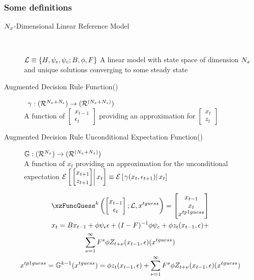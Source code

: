 \documentclass[tikz]{beamer}
\begin{document}
\begin{frame}
  \frametitle{Some definitions}

{\small

  \begin{description}
  \item[${N_x}$-Dimensional Linear Reference Model] \ 

${\mathcal{L}} \equiv {\{H,\psi_\epsilon,\psi_c;B,\phi,F\}}$ A linear model with state space of dimension
${N_x}$ and unique solutions converging 
to some steady state
  \item[Augmented Decision Rule Function(\ADR)]  \ 
${{\gamma}}: {({\mathcal{R}^{{N_x}+{N_\epsilon}}})\rightarrow ({\mathcal{R}^{({{N_x}+{N_z}})}})}$ \\
 A function of $
\begin{bmatrix}
  x_{t-1}\\\epsilon_t
\end{bmatrix}
$ providing an approximation 
for $\begin{bmatrix}
  x_t\\z_t
\end{bmatrix}$
  \item[Augmented Decision Rule Unconditional Expectation Function(\ADRUE)] 

${\mathbb{G}}: {({\mathcal{R}^{{N_x}}})\rightarrow ({\mathcal{R}^{({{N_x}+{N_z}})}})}$ \\ A function of $x_t$ providing an approximation 
for the unconditional expectation  
${\mathcal{E}\left [ \left . \begin{bmatrix}
  x_{t+1}\\z_{t+1}
\end{bmatrix} \right | x_t \right ]}\equiv  {\mathcal{E}\left [ \left . {{\gamma}}(x_t,\epsilon_{t+1}) \right | x_t \right ]}$

  \end{description}

}

\end{frame}




\begin{frame}

{\small
  \begin{gather}
  \xzFuncGuess^k \left (
  \begin{bmatrix}
    x_{t-1} \\\epsilon_t
  \end{bmatrix}; \linMod,\xguss
\right )=
  \begin{bmatrix}
    x_{t-1}\\ x_t\\ \xtpguss
  \end{bmatrix}\\
x_t= \sumLinPart + \sumZPartZero +\\  \sumZPartPos(\xguss)  \label{seriesForm}\\ 
\xtpguss=\XZFunc^{k-1}(\xguss) = \sumZPartZero +  \sumZPartPos(\xguss)
  \end{gather}
}
\end{frame}
\end{document}
